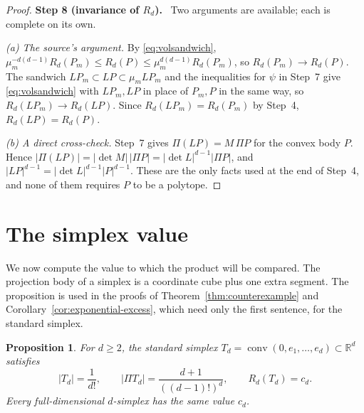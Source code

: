 \documentclass[11pt]{article}
\newtheorem{proposition}[theorem]{Proposition}
\newcommand{\R}{\mathbb R}
\DeclareMathOperator{\conv}{conv}
\newcommand{\step}[1]{\par\smallskip\noindent\textbf{#1}\ }
\begin{document}
\begin{proof}
\step{Step 8 (invariance of \(R_d\)).} Two arguments are available; each is
complete on its own.

\emph{(a) The source's argument.} By \eqref{eq:volsandwich},
\(\mu_m^{-d(d-1)}R_d(P_m)\le R_d(P)\le\mu_m^{d(d-1)}R_d(P_m)\), so
\(R_d(P_m)\to R_d(P)\). The sandwich \(LP_m\subset LP\subset\mu_mLP_m\) and
the inequalities for \(\psi\) in Step~7 give \eqref{eq:volsandwich} with
\(LP_m,LP\) in place of \(P_m,P\) in the same way, so
\(R_d(LP_m)\to R_d(LP)\). Since \(R_d(LP_m)=R_d(P_m)\) by Step~4,
\(R_d(LP)=R_d(P)\).

\emph{(b) A direct cross-check.} Step~7 gives \(\Pi(LP)=M\,\Pi P\) for the
convex body \(P\). Hence
\(|\Pi(LP)|=|\det M|\,|\Pi P|=|\det L|^{d-1}|\Pi P|\), and
\(|LP|^{d-1}=|\det L|^{d-1}|P|^{d-1}\). These are the only facts used at
the end of Step~4, and none of them requires \(P\) to be a polytope.
\end{proof}

\section{The simplex value}\label{sec:simplex}

We now compute the value to which the product will be compared. The
projection body of a simplex is a coordinate cube plus one extra segment.
The proposition is used in the proofs of Theorem~\ref{thm:counterexample}
and Corollary~\ref{cor:exponential-excess}, which need only the first
sentence, for the standard simplex.

\begin{proposition}\label{prop:simplex}
For \(d\ge2\), the standard simplex
\(T_d=\conv(0,e_1,\ldots,e_d)\subset\R^d\) satisfies
\[
 |T_d|=\frac1{d!},\qquad
 |\Pi T_d|=\frac{d+1}{((d-1)!)^d},\qquad
 R_d(T_d)=c_d.
\]
Every full-dimensional \(d\)-simplex has the same value \(c_d\).
\end{proposition}
\end{document}
